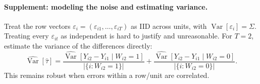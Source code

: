 \paragraph{Supplement: modeling the noise and estimating variance.}
Treat the row vectors $\varepsilon_i=(\varepsilon_{i1},\ldots,\varepsilon_{iT})$ as IID across units, with $\operatorname{Var}[\varepsilon_i]=\Sigma$. Treating every $\varepsilon_{it}$ as independent is hard to justify and unreasonable. For $T=2$, estimate the variance of the differences directly:
\[
\widehat{\operatorname{Var}}[\widehat\tau]
=\frac{\widehat{\operatorname{Var}}[Y_{i2}-Y_{i1}\mid W_{i2}=1]}{|\{i:W_{i2}=1\}|}
+\frac{\widehat{\operatorname{Var}}[Y_{i2}-Y_{i1}\mid W_{i2}=0]}{|\{i:W_{i2}=0\}|}.
\tag{8.4 in the notes}
\]
This remains robust when errors within a row/unit are correlated.

